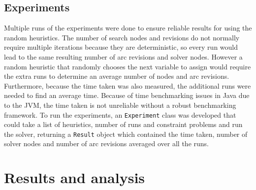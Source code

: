 \documentclass{article}
\begin{document}
\subsection{Experiments}
Multiple runs of the experiments were done to ensure reliable results for using the random heuristics. The number of search nodes and revisions do not normally require multiple iterations because they are deterministic, so every run would lead to the same resulting number of arc revisions and solver nodes. However a random heuristic that randomly chooses the next variable to assign would require the extra runs to determine an average number of nodes and arc revisions. Furthermore, because the time taken was also measured, the additional runs were needed to find an average time. Because of time benchmarking issues in Java due to the JVM, the time taken is not unreliable without a robust benchmarking framework. 
\n
To run the experiments, an \texttt{Experiment} class was developed that could take a list of heuristics, number of runs and constraint problems and run the solver, returning a \texttt{Result} object which contained the time taken, number of solver nodes and number of arc revisions averaged over all the runs. 

\section{Results and analysis}
\newcommand{\cspplot}[6]{
\begin{tikzpicture}[scale=0.55]
\begin{axis}[
	title = {\textbf{#1}},
	legend pos=#6,
	ymode=log,
	xlabel={#2},
	ylabel={#3}
]



\addplot+[only marks, fill opacity=0.2,
		discard if not={Heuristic}{No heuristic},
] table [x=#2, y=#3, col sep=comma] {data/#4};
\addlegendentry{Static Ascending}

\addplot+[only marks, fill opacity=0.2,
		discard if not={Heuristic}{Smallest Domain First},
] table [x=#2, y=#3, col sep=comma] {data/#4};
\addlegendentry{SDF}

\addplot+[only marks, fill opacity=0.2,
		discard if not={Heuristic}{Largest Domain First},
] table [x=#2, y=#3, col sep=comma] {data/#4};
\addlegendentry{LDF}

\addplot+[only marks, fill opacity=0.2,
		discard if not={Heuristic}{Maximum Degree},
] table [x=#2, y=#3, col sep=comma] {data/#4};
\addlegendentry{Maximum Degree}

\addplot+[only marks, fill opacity=0.2,
		discard if not={Heuristic}{Random},
] table [x=#2, y=#3, col sep=comma] {data/#4};
\addlegendentry{Random}


#5
\end{axis}
\end{tikzpicture}
}
\end{document}
